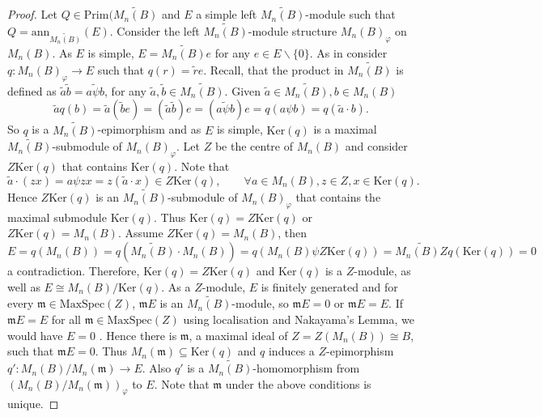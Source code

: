 \documentclass[oneside, a4paper, 11pt]{amsart}
\newcommand{\Ker}[1]{\mathrm{Ker}(#1)}
\newcommand{\ann}{\mathrm{ann}}
\newcommand{\Prim}{\mathrm{Prim}}
\newcommand{\MaxSpec}{\mathrm{MaxSpec}}
\begin{document}
\begin{proof}
Let $Q\in \Prim(\widetilde{M_n(B)}$ and $E$ a simple left $\widetilde{M_n(B)}$-module such that $Q=\ann_{\widetilde{M_n(B)}}(E)$.  Consider the left $\widetilde{M_n(B)}$-module structure $M_n(B)_\varphi$ on $M_n(B)$. As $E$ is simple, $E=\widetilde{M_n(B)} e$ for any $e\in E\backslash\{0\}$. As in \cite[Proposition 3.10]{KXaffine} consider $q:M_n(B)_\varphi \rightarrow E$ such that $q(r)=\tilde{r}e$. Recall, that the product in $\widetilde{M_n(B)}$ is defined as $\tilde{a}\tilde{b}=\widetilde{a\psi b}$, for any $\tilde{a}, \tilde{b}\in \widetilde{M_n(B)}$. 
Given $\tilde{a}\in \widetilde{M_n(B)}, b\in M_n(B)$
$$\tilde{a}q(b)=\tilde{a}(\tilde{b}e)=(\tilde{a}\tilde{b})e=(\widetilde{a\psi b}) e=q(a\psi b)=q(\tilde{a}\cdot b).$$
So $q$ is a $\widetilde{M_n(B)}$-epimorphism and as $E$ is simple, $\Ker{q}$ is a maximal $\widetilde{M_n(B)}$-submodule of ${M_n(B)}_\varphi$. Let $Z$ be the centre of $M_n(B)$ and consider $Z\Ker{q}$ that contains $\Ker{q}$. Note that 
$$\tilde{a}\cdot (zx)=a\psi zx=z(\tilde{a}\cdot x)\in Z \Ker{q}, \qquad \forall a\in M_n(B), z\in Z, x\in \Ker{q}.$$
Hence $Z\Ker{q}$ is an $\widetilde{M_n(B)}$-submodule of $M_n(B)_\varphi$ that contains the maximal submodule $\Ker{q}$. Thus $\Ker{q}=Z\Ker{q}$ or $Z\Ker{q}=M_n(B)$. Assume  $Z\Ker{q}=M_n(B)$, then
$$E = q(M_n(B)) = q(\widetilde{M_n(B)}\cdot M_n(B))=q(M_n(B)\psi Z\Ker{q})=\widetilde{M_n(B)Z}q(\Ker{q})=0$$
a contradiction. Therefore,  $\Ker{q}=Z\Ker{q}$ and $\Ker{q}$ is a $Z$-module, as well as $E\cong M_n(B)/\Ker{q}$. As a $Z$-module, $E$ is  finitely generated and for every $\mathfrak{m}\in \MaxSpec(Z)$, $\mathfrak{m}E$ is an $\widetilde{M_n(B)}$-module, so $\mathfrak{m}E=0$ or $\mathfrak{m}E=E$.
If  $\mathfrak{m}E=E$ for all $\mathfrak{m}\in \MaxSpec(Z)$ using localisation and Nakayama's Lemma, we would have $E=0$ \cite[Proposition 3.8]{Atiyah}. Hence there is $\mathfrak{m}$, a maximal ideal of $Z=Z(M_n(B))\cong B$, such that $\mathfrak{m}E=0$. Thus $M_n(\mathfrak{m})\subseteq \Ker{q}$ and $q$ induces a $Z$-epimorphism $q':M_n(B)/M_n(\mathfrak{m}) \longrightarrow E$. Also $q'$ is a $\widetilde{M_n(B)}$-homomorphism from $(M_n(B)/M_n(\mathfrak{m}))_{\varphi}$ to $E$. Note that $\mathfrak{m}$ under the above conditions is unique.%


\end{proof}
\end{document}
